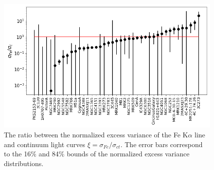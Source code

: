 

\begin{figure} 
 \centering
 \includegraphics[width=\textwidth]{Figs/Chapter5/ratio_1s.png}
 \caption{The ratio between the normalized excess variance of the Fe K$\alpha$ line and continuum light curves $\xi=\sigma_{Fe}/\sigma_{ct}$. The error bars correspond to the 16$\%$ and 84$\%$ bounds of the normalized excess variance distributions.}\label{fig:exvars}
 \end{figure} 

